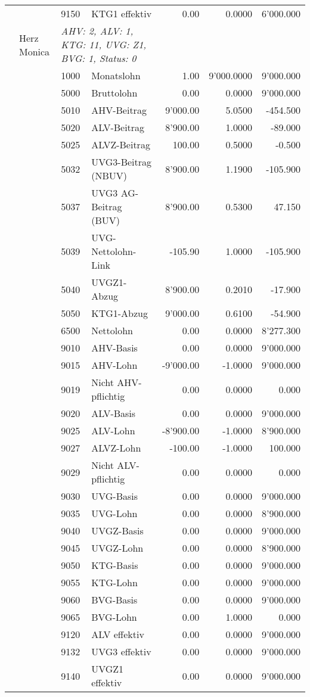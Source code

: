 \documentclass[15pt,a4paper]{article}
\begin{document}
\begin{longtable}{@{\extracolsep{\fill}}l l l l|r|r|r}
&&9150&KTG1 effektiv&0.00&0.0000&6'000.000\\
\pagebreak
11&Herz Monica&\multicolumn{2}{l|}{\small\emph{AHV: 2, ALV: 1, KTG: 11, UVG: Z1, BVG: 1, Status: 0}}&& \\
&&1000&Monatslohn&1.00&9'000.0000&9'000.000\\
&&5000&Bruttolohn&0.00&0.0000&9'000.000\\
&&5010&AHV-Beitrag&9'000.00&5.0500&-454.500\\
&&5020&ALV-Beitrag&8'900.00&1.0000&-89.000\\
&&5025&ALVZ-Beitrag&100.00&0.5000&-0.500\\
&&5032&UVG3-Beitrag (NBUV)&8'900.00&1.1900&-105.900\\
&&5037&UVG3 AG-Beitrag (BUV)&8'900.00&0.5300&47.150\\
&&5039&UVG-Nettolohn-Link&-105.90&1.0000&-105.900\\
&&5040&UVGZ1-Abzug&8'900.00&0.2010&-17.900\\
&&5050&KTG1-Abzug&9'000.00&0.6100&-54.900\\
&&6500&Nettolohn&0.00&0.0000&8'277.300\\
&&9010&AHV-Basis&0.00&0.0000&9'000.000\\
&&9015&AHV-Lohn&-9'000.00&-1.0000&9'000.000\\
&&9019&Nicht AHV-pflichtig&0.00&0.0000&0.000\\
&&9020&ALV-Basis&0.00&0.0000&9'000.000\\
&&9025&ALV-Lohn&-8'900.00&-1.0000&8'900.000\\
&&9027&ALVZ-Lohn&-100.00&-1.0000&100.000\\
&&9029&Nicht ALV-pflichtig&0.00&0.0000&0.000\\
&&9030&UVG-Basis&0.00&0.0000&9'000.000\\
&&9035&UVG-Lohn&0.00&0.0000&8'900.000\\
&&9040&UVGZ-Basis&0.00&0.0000&9'000.000\\
&&9045&UVGZ-Lohn&0.00&0.0000&8'900.000\\
&&9050&KTG-Basis&0.00&0.0000&9'000.000\\
&&9055&KTG-Lohn&0.00&0.0000&9'000.000\\
&&9060&BVG-Basis&0.00&0.0000&9'000.000\\
&&9065&BVG-Lohn&0.00&1.0000&0.000\\
&&9120&ALV effektiv&0.00&0.0000&9'000.000\\
&&9132&UVG3 effektiv&0.00&0.0000&9'000.000\\
&&9140&UVGZ1 effektiv&0.00&0.0000&9'000.000\\

\end{longtable}
\end{document}
